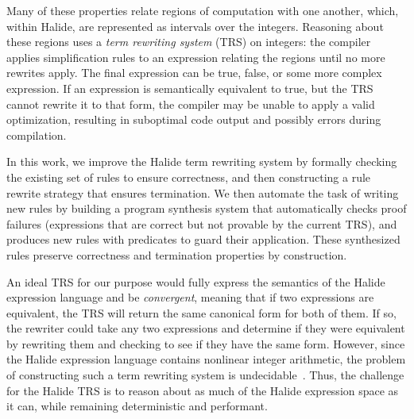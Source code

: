 \documentclass[sigplan,10pt,review,anonymous]{acmart}\settopmatter{printfolios=true,printccs=false,printacmref=false}
\begin{document}
Many of these properties relate regions of computation with one another,
which, within Halide, are represented as intervals over the integers.
Reasoning about these regions uses a \textit{term rewriting system}
(TRS) on integers: the compiler applies simplification rules to an expression relating
the regions until no more rewrites apply.  The final expression can be
true, false, or some more complex expression. If an expression is semantically equivalent to true,
but the TRS cannot rewrite it to that form, the compiler may be unable to apply a valid optimization,
resulting in suboptimal code output and possibly errors during compilation.

In this work, we improve the Halide term rewriting system by formally checking the existing
set of rules to ensure correctness, and then constructing a rule rewrite strategy that 
ensures termination.  We then automate the task of writing new rules by building a program
synthesis system that automatically checks proof failures (expressions that are
correct but not provable by the current TRS), and produces new rules with predicates to guard their application.
These synthesized rules preserve correctness and termination properties by construction.

An ideal TRS for our purpose would fully express the semantics of the Halide
expression language and be \emph{convergent}, meaning that if two expressions
are equivalent, the TRS will return the same canonical form for both of them. If
so, the rewriter could take any two expressions and determine if they were
equivalent by rewriting them and checking to see if they have the same form.
However, since the Halide expression language contains nonlinear integer
arithmetic, the problem of constructing such a term rewriting system is
undecidable~\cite{matiyasevich1993hilberts10th}. Thus, the challenge for the
Halide TRS is to reason about as much of the Halide expression space
as it can, while remaining deterministic and performant.

\end{document}
